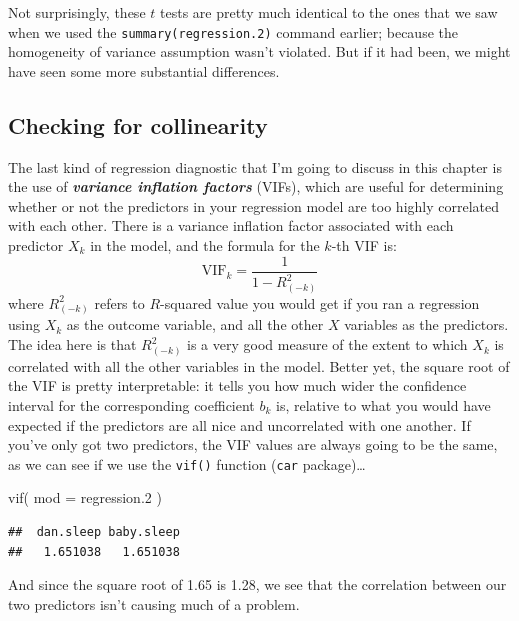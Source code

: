\documentclass[
]{book}
\newenvironment{Shaded}{\begin{snugshade}}{\end{snugshade}}
\newcommand{\AttributeTok}[1]{\textcolor[rgb]{0.77,0.63,0.00}{#1}}
\newcommand{\FloatTok}[1]{\textcolor[rgb]{0.00,0.00,0.81}{#1}}
\newcommand{\FunctionTok}[1]{\textcolor[rgb]{0.00,0.00,0.00}{#1}}
\newcommand{\NormalTok}[1]{#1}
\begin{document}
Not surprisingly, these \(t\) tests are pretty much identical to the ones that we saw when we used the \texttt{summary(regression.2)} command earlier; because the homogeneity of variance assumption wasn't violated. But if it had been, we might have seen some more substantial differences.

\hypertarget{regressioncollinearity}{%
\subsection{Checking for collinearity}\label{regressioncollinearity}}

The last kind of regression diagnostic that I'm going to discuss in this chapter is the use of \textbf{\emph{variance inflation factors}} (VIFs), which are useful for determining whether or not the predictors in your regression model are too highly correlated with each other. There is a variance inflation factor associated with each predictor \(X_k\) in the model, and the formula for the \(k\)-th VIF is:
\[
\mbox{VIF}_k = \frac{1}{1-{R^2_{(-k)}}}
\]
where \(R^2_{(-k)}\) refers to \(R\)-squared value you would get if you ran a regression using \(X_k\) as the outcome variable, and all the other \(X\) variables as the predictors. The idea here is that \(R^2_{(-k)}\) is a very good measure of the extent to which \(X_k\) is correlated with all the other variables in the model. Better yet, the square root of the VIF is pretty interpretable: it tells you how much wider the confidence interval for the corresponding coefficient \(b_k\) is, relative to what you would have expected if the predictors are all nice and uncorrelated with one another. If you've only got two predictors, the VIF values are always going to be the same, as we can see if we use the \texttt{vif()} function (\texttt{car} package)\ldots{}

\begin{Shaded}
\begin{Highlighting}[]
\FunctionTok{vif}\NormalTok{( }\AttributeTok{mod =}\NormalTok{ regression}\FloatTok{.2}\NormalTok{ )}
\end{Highlighting}
\end{Shaded}

\begin{verbatim}
##  dan.sleep baby.sleep 
##   1.651038   1.651038
\end{verbatim}

And since the square root of 1.65 is 1.28, we see that the correlation between our two predictors isn't causing much of a problem.
\end{document}
